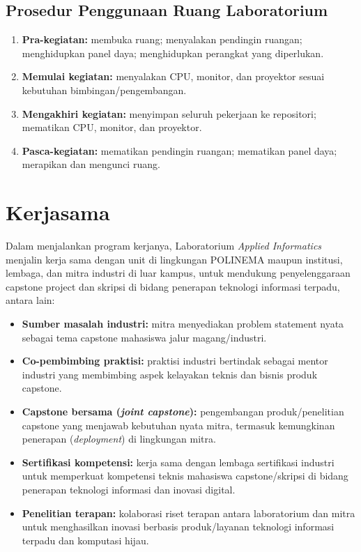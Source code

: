 \documentclass[12pt,a4paper]{report}
\begin{document}
\section{Prosedur Penggunaan Ruang Laboratorium}
\begin{enumerate}
\item \textbf{Pra-kegiatan:} membuka ruang; menyalakan pendingin ruangan; menghidupkan panel daya; menghidupkan perangkat yang diperlukan.
\item \textbf{Memulai kegiatan:} menyalakan CPU, monitor, dan proyektor sesuai kebutuhan bimbingan/pengembangan.
\item \textbf{Mengakhiri kegiatan:} menyimpan seluruh pekerjaan ke repositori; mematikan CPU, monitor, dan proyektor.
\item \textbf{Pasca-kegiatan:} mematikan pendingin ruangan; mematikan panel daya; merapikan dan mengunci ruang.
\end{enumerate}

\chapter{Kerjasama}

Dalam menjalankan program kerjanya, Laboratorium \emph{Applied Informatics} menjalin kerja sama dengan unit di lingkungan POLINEMA maupun institusi, lembaga, dan mitra industri di luar kampus, untuk mendukung penyelenggaraan capstone project dan skripsi di bidang penerapan teknologi informasi terpadu, antara lain:
\begin{itemize}
\item \textbf{Sumber masalah industri:} mitra menyediakan problem statement nyata sebagai tema capstone mahasiswa jalur magang/industri.
\item \textbf{Co-pembimbing praktisi:} praktisi industri bertindak sebagai mentor industri yang membimbing aspek kelayakan teknis dan bisnis produk capstone.
\item \textbf{Capstone bersama (\emph{joint capstone}):} pengembangan produk/penelitian capstone yang menjawab kebutuhan nyata mitra, termasuk kemungkinan penerapan (\emph{deployment}) di lingkungan mitra.
\item \textbf{Sertifikasi kompetensi:} kerja sama dengan lembaga sertifikasi industri untuk memperkuat kompetensi teknis mahasiswa capstone/skripsi di bidang penerapan teknologi informasi dan inovasi digital.
\item \textbf{Penelitian terapan:} kolaborasi riset terapan antara laboratorium dan mitra untuk menghasilkan inovasi berbasis produk/layanan teknologi informasi terpadu dan komputasi hijau.
\end{itemize}

\PedomanPengesahan
\end{document}
